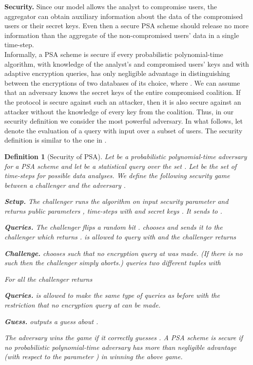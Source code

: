 \documentclass[10pt]{extarticle}
\newtheorem{Def}{Definition}
\begin{document}
\noindent\textbf{Security.} Since our model allows the analyst to compromise users, the aggregator can obtain auxiliary information about the data of the compromised users or their secret keys. Even then a secure PSA scheme should release no more information than the aggregate of the non-compromised users' data in a single time-step.\\
Informally, a PSA scheme  is secure if every probabilistic polynomial-time algorithm, with knowledge of the analyst's and compromised users' keys and with adaptive encryption queries, has only negligible advantage in distinguishing between the encryptions of two databases  of its choice, where . We can assume that an adversary knows the secret keys of the entire compromised coalition. If the protocol is secure against such an attacker, then it is also secure against an attacker without the knowledge of every key from the coalition. Thus, in our security definition we consider the most powerful adversary. In what follows, let  denote the evaluation of a query  with input  over a subset  of users. The security definition is similar to the one in \cite{2}.

\begin{Def}[Security of PSA]\label{securitygame}
Let  be a probabilistic polynomial-time adversary for a PSA scheme  and let  be a statistical query over the set . Let  be the set of time-steps for possible data analyses. We define the following security game between a challenger and the adversary .
\begin{description}
 \item\textbf{Setup.} The challenger runs the  algorithm on input security parameter  and returns public parameters , time-steps  with  and secret keys . It sends  to .
\item\textbf{Queries.} The challenger flips a random bit .  chooses  and sends it to the challenger which returns .
  is allowed to query  with  and the challenger returns 
\item\textbf{Challenge.}  chooses  such that no encryption query at  was made. (If there is no such  then the challenger simply aborts.)  queries two different tuples  with
 
For all  the challenger returns 

\item\textbf{Queries.}  is allowed to make the same type of queries as before with the restriction that no encryption query at  can be made.
\item\textbf{Guess.}  outputs a guess about .
\end{description}
The adversary wins the game if it correctly guesses . A PSA scheme is secure if no probabilistic polynomial-time adversary  has more than negligible advantage (with respect to the parameter ) in winning the above game.
\end{Def}
\end{document}
